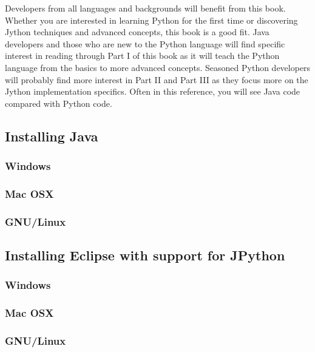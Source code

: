 Developers from all languages and backgrounds will benefit from this book. Whether you are interested in learning Python for the first time or discovering Jython techniques and advanced concepts, this book is a good fit. Java developers and those who are new to the Python language will find specific interest in reading through Part I of this book as it will teach the Python language from the basics to more advanced concepts. Seasoned Python developers will probably find more interest in Part II and Part III as they focus more on the Jython implementation specifics. Often in this reference, you will see Java code compared with Python code.


\subsection{Installing Java}

\subsubsection{Windows}

\subsubsection{Mac OSX}

\subsubsection{GNU/Linux}



\subsection{Installing Eclipse with support for JPython}


\subsubsection{Windows}

\subsubsection{Mac OSX}

\subsubsection{GNU/Linux}






